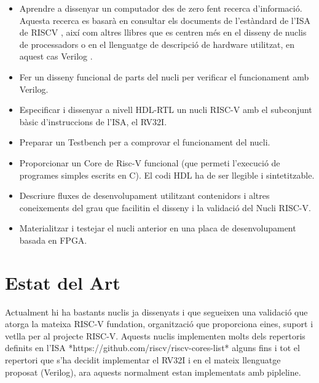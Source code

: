 \documentclass[10pt,a4paper,twocolumn,twoside]{article}
\begin{document}
\begin{itemize}

    \item Aprendre a dissenyar un computador des de zero fent recerca d'informació. Aquesta recerca es basarà en consultar els documents de l’estàndard de l'ISA de RISCV \cite{waterman_volume_2019} \cite{waterman_volume_2019-1}, així com altres llibres que es centren més en el disseny de nuclis de processadors \cite{patterson_computer_2018} o en el llenguatge de descripció de hardware utilitzat, en aquest cas Verilog \cite{li_implementing_2018}.
    
    \item Fer un disseny funcional de parts del nucli per verificar el funcionament amb Verilog.

    \item Especificar i dissenyar a nivell HDL-RTL un nucli RISC-V amb el subconjunt bàsic d'instruccions de l’ISA, el RV32I.
    
    \item Preparar un Testbench per a comprovar el funcionament del nucli.
    
    \item Proporcionar un Core de Risc-V funcional (que permeti l'execució de programes simples escrits en C). El codi HDL ha de ser llegible i sintetitzable.
    
    \item Descriure fluxes de desenvolupament utilitzant contenidors i altres coneixements del grau que facilitin el disseny i la validació del Nucli RISC-V.  
    
    \item Materialitzar i testejar el nucli anterior en una placa de desenvolupament basada en FPGA.
    
        
\end{itemize}

\section{Estat del Art}
Actualment hi ha bastants nuclis ja dissenyats i que segueixen una validació que atorga la mateixa RISC-V fundation, organització que proporciona eines, suport i vetlla per al projecte RISC-V. Aquests nuclis implementen molts dels repertoris definits en l'ISA *https://github.com/riscv/riscv-cores-list* alguns fins i tot el repertori que s'ha decidit implementar el RV32I i en el mateix llenguatge proposat (Verilog), ara aquests normalment estan implementats amb pipleline. 
\end{document}
